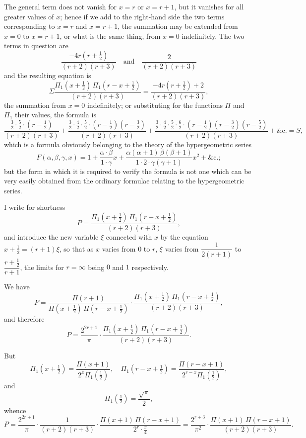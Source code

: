 \documentclass[11pt,a4paper]{book}
\begin{document}
The general term does not vanish for $x=r$ or $x=r+1$, but it vanishes for all greater values of $x$; hence if we add to the right-hand side the two terms corresponding to $x=r$ and $x=r+1$, the summation may be extended from $x=0$ to $x=r+1$, or what is the same thing, from $x=0$ indefinitely. The two terms in question are
\[
\frac{-4r(r+\tfrac{1}{2})}{(r+2)(r+3)} \quad \text{and} \quad \frac{2}{(r+2)(r+3)}
\]
and the resulting equation is
\[
\Sigma \frac{\Pi_1(x + \tfrac{1}{2})\,\Pi_1(r - x + \tfrac{1}{2})}{(r+2)(r+3)} = \frac{-4r(r+\tfrac{1}{2}) + 2}{(r+2)(r+3)},
\]
the summation from $x=0$ indefinitely; or substituting for the functions $\Pi$ and $\Pi_1$ their values, the formula is
\[
\frac{\tfrac{3}{2} \cdot \tfrac{5}{2} \cdot (r - \tfrac{1}{2})}{(r+2)(r+3)} + \frac{\tfrac{3}{2} \cdot \tfrac{4}{2} \cdot \tfrac{5}{2} \cdot (r - \tfrac{1}{2})(r - \tfrac{3}{2})}{(r+2)(r+3)} + \frac{\tfrac{3}{2} \cdot \tfrac{4}{2} \cdot \tfrac{5}{2} \cdot \tfrac{6}{2} \cdot (r - \tfrac{1}{2})(r - \tfrac{3}{2})(r - \tfrac{5}{2})}{(r+2)(r+3)} + \&\text{c.} = S,
\]
which is a formula obviously belonging to the theory of the hypergeometric series
\[
F(\alpha, \beta, \gamma, x) = 1 + \frac{\alpha \cdot \beta}{1 \cdot \gamma}x + \frac{\alpha(\alpha+1)\,\beta(\beta+1)}{1 \cdot 2 \cdot \gamma(\gamma+1)}x^2 + \&\text{c.};
\]
but the form in which it is required to verify the formula is not one which can be very easily obtained from the ordinary formulae relating to the hypergeometric series.

I write for shortness
\[
P = \frac{\Pi_1(x + \tfrac{1}{2})\,\Pi_1(r - x + \tfrac{1}{2})}{(r+2)(r+3)},
\]
and introduce the new variable $\xi$ connected with $x$ by the equation $x + \tfrac{1}{2} = (r+1)\xi$, so that as $x$ varies from $0$ to $r$, $\xi$ varies from $\dfrac{1}{2(r+1)}$ to $\dfrac{r+\tfrac{1}{2}}{r+1}$, the limits for $r=\infty$ being $0$ and $1$ respectively.

We have
\[
P = \frac{\Pi(r+1)}{\Pi(x+\tfrac{1}{2})\,\Pi(r-x+\tfrac{1}{2})} \cdot \frac{\Pi_1(x+\tfrac{1}{2})\,\Pi_1(r-x+\tfrac{1}{2})}{(r+2)(r+3)},
\]
and therefore
\[
P = \frac{2^{2r+1}}{\pi} \cdot \frac{\Pi_1(x+\tfrac{1}{2})\,\Pi_1(r-x+\tfrac{1}{2})}{(r+2)(r+3)}.
\]

But
\[
\Pi_1(x + \tfrac{1}{2}) = \frac{\Pi(x+1)}{2^x \Pi_1(\tfrac{1}{2})}, \quad \Pi_1(r - x + \tfrac{1}{2}) = \frac{\Pi(r-x+1)}{2^{r-x}\Pi_1(\tfrac{1}{2})},
\]
and
\[
\Pi_1(\tfrac{1}{2}) = \frac{\sqrt{\pi}}{2},
\]
whence
\[
P = \frac{2^{2r+1}}{\pi} \cdot \frac{1}{(r+2)(r+3)} \cdot \frac{\Pi(x+1)\,\Pi(r-x+1)}{2^r \cdot \tfrac{\pi}{4}} = \frac{2^{r+3}}{\pi^2} \cdot \frac{\Pi(x+1)\,\Pi(r-x+1)}{(r+2)(r+3)}.
\]
\end{document}
